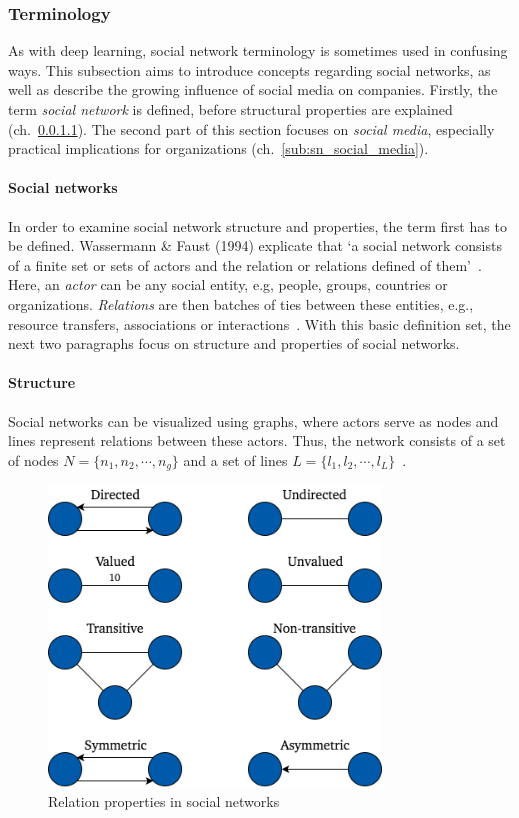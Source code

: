 \subsubsection{Terminology}
\label{sub:sn_terminology}

As with deep learning, social network terminology is sometimes used in confusing
ways.
This subsection aims to introduce concepts regarding social networks, as well
as describe the growing influence of social media on companies.
Firstly, the term \textit{social network} is defined, before structural
properties are explained (ch.~\ref{sub:sn_social_networks}).
The second part of this section focuses on \textit{social media}, especially
practical implications for organizations (ch.~\ref{sub:sn_social_media}).

\paragraph{Social networks}
\label{sub:sn_social_networks}

In order to examine social network structure and properties, the term first
has to be defined.
Wassermann \& Faust (1994) explicate that `a social network consists of a finite
set or sets of actors and the relation or relations defined of them'~\cite[p. 20]{Wasserman1994}.
Here, an \textit{actor} can be any social entity, e.g, people, groups, countries or
organizations.
\textit{Relations} are then batches of ties between these entities, e.g., resource
transfers, associations or interactions~\cite{Wasserman1994}.
With this basic definition set, the next two paragraphs focus on structure and
properties of social networks.

\paragraph{Structure}

Social networks can be visualized using graphs, where actors serve as nodes
and lines represent relations between these actors.
Thus, the network consists of a set of nodes $N = \{n_1, n_2, \cdots, n_g\}$ and
a set of lines $L = \{l_1, l_2, \cdots, l_L\}$~\cite{Wasserman1994}.

\begin{figure}[h]
  \centering
  \includegraphics[height=8cm]{img/relation_properties}
  \caption{Relation properties in social networks}
\label{fig:tie_properties}
\end{figure}

